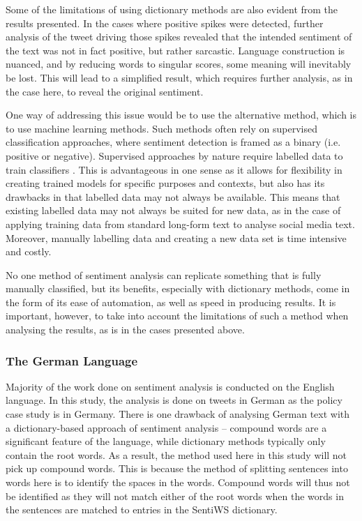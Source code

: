 \documentclass[12pt,onecolumn,twoside]{layout}
\begin{document}
Some of the limitations of using dictionary methods are also evident from the results presented. In the cases where positive spikes were detected, further analysis of the tweet driving those spikes revealed that the intended sentiment of the text was not in fact positive, but rather sarcastic. Language construction is nuanced, and by reducing words to singular scores, some meaning will inevitably be lost. This will lead to a simplified result, which requires further analysis, as in the case here, to reveal the original sentiment.

One way of addressing this issue would be to use the alternative method, which is to use machine learning methods. Such methods often rely on supervised classification approaches, where sentiment detection is framed as a binary (i.e. positive or negative). Supervised approaches by nature require labelled data to train classifiers \citep{Pang2002}. This is advantageous in one sense as it allows for flexibility in creating trained models for specific purposes and contexts, but also has its drawbacks in that labelled data may not always be available. This means that existing labelled data may not always be suited for new data, as in the case of applying training data from standard long-form text to analyse social media text. Moreover, manually labelling data and creating a new data set is time intensive and costly.

No one method of sentiment analysis can replicate something that is fully manually classified, but its benefits, especially with dictionary methods, come in the form of its ease of automation, as well as speed in producing results. It is important, however, to take into account the limitations of such a method when analysing the results, as is in the cases presented above.

\subsubsection*{The German Language}
Majority of the work done on sentiment analysis is conducted on the English language. In this study, the analysis is done on tweets in German as the policy case study is in Germany. There is one drawback of analysing German text with a dictionary-based approach of sentiment analysis -- compound words are a significant feature of the language, while dictionary methods typically only contain the root words. As a result, the method used here in this study will not pick up compound words. This is because the method of splitting sentences into words here is to identify the spaces in the words. Compound words will thus not be identified as they will not match either of the root words when the words in the sentences are matched to entries in the SentiWS dictionary.
\end{document}
